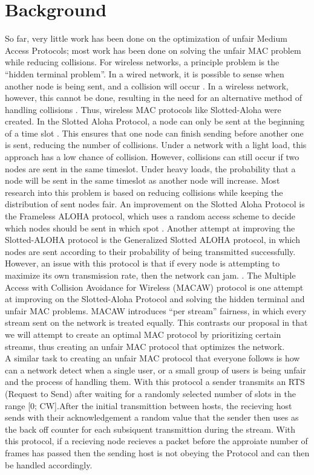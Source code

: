 \documentclass{sigcomm-alternate}
\begin{document}
\section{Background}
{
So far, very little work has been done on the optimization of unfair Medium Access Protocols; most work has been done on solving the unfair MAC problem while reducing collisions. For wireless networks, a principle problem is the “hidden terminal problem”. In a wired network, it is possible to sense when another node is being sent, and a collision will occur \cite{869217}. In a wireless network, however, this cannot be done, resulting in the need for an alternative method of handling collisions \cite{6574961}. Thus, wireless MAC protocols like Slotted-Aloha were created.  In the Slotted Aloha Protocol, a node can only be sent at the beginning of a time slot \cite{5340799}. This ensures that one node can finish sending before another one is sent, reducing the number of collisions.  Under a network with a light load, this approach has a low chance of collision. However, collisions can still occur if two nodes are sent in the same timeslot. Under heavy loads, the probability that a node will be sent in the same timeslot as another node will increase. Most research into this problem is based on reducing collisions while keeping the distribution of sent nodes fair.  An improvement on the Slotted Aloha Protocol is the Frameless ALOHA protocol, which uses a random access scheme to decide which nodes should be sent in which spot \cite{6336861}. Another attempt at improving the Slotted-ALOHA protocol is the Generalized Slotted ALOHA protocol, in which nodes are sent according to their probability of being transmitted successfully. However, an issue with this protocol is that if every node is attempting to maximize its own transmission rate, then the network can jam. \cite{4548143 }.  The Multiple Access with Collision Avoidance for Wireless (MACAW) protocol is one attempt at improving on the Slotted-Aloha Protocol and solving the hidden terminal and unfair MAC problems. MACAW introduces “per stream” fairness, in which every stream sent on the network is treated equally. This contrasts our proposal in that we will attempt to create an optimal MAC protocol by prioritizing certain streams, thus creating an unfair MAC protocol that optimizes the network.\\

A similar task to creating an unfair MAC protocol that everyone follows is how can a network detect when a single user, or a small group of users is being unfair and the process of handling them. With this protocol a sender transmits an RTS (Request to Send) after waiting for a randomly selected number of slots in the range [0; CW].After the initial transmittion between hosts, the recieving host sends with their acknowledgement a random value that the sender then uses as the back off counter for each subsiquent transmittion during the stream. \cite{Kyasanur} With this protocol, if a recieving node recieves a packet before the approiate number of frames has passed then the sending host is not obeying the Protocol and can then be handled accordingly.
}



\balancecolumns
\end{document}
